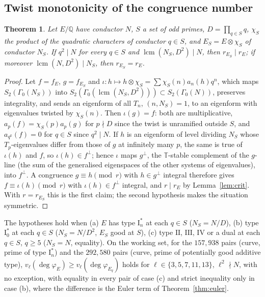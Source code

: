 \documentclass[11pt]{amsart}
\newtheorem{theorem}{Theorem}[section]
\theoremstyle{definition}
\newcommand{\Q}{\mathbb{Q}}
\newcommand{\T}{\mathbb{T}}
\newcommand{\degphi}{\deg\varphi_E}
\begin{document}
\subsection{Twist monotonicity of the congruence number}
\begin{theorem}\label{thm:twist}
Let $E/\Q$ have conductor $N$, $S$ a set of odd primes, $D=\prod_{q\in S}q$, $\chi_S$ the product of the quadratic characters of conductor $q\in S$, and $E_S=E\otimes\chi_S$ of conductor $N_S$. If $q^2\mid N$ for every $q\in S$ and $\operatorname{lcm}(N_S,D^2)\mid N$, then $r_{E_S}\mid r_E$; if moreover $\operatorname{lcm}(N,D^2)\mid N_S$, then $r_{E_S}=r_E$.
\end{theorem}
\begin{proof}
Let $f=f_E$, $g=f_{E_S}$ and $\iota\colon h\mapsto h\otimes\chi_S=\sum\chi_S(n)a_n(h)q^n$, which maps $S_2(\Gamma_0(N_S))$ into $S_2(\Gamma_0(\operatorname{lcm}(N_S,D^2)))\subset S_2(\Gamma_0(N))$, preserves integrality, and sends an eigenform of all $T_n$, $(n,N_S)=1$, to an eigenform with eigenvalues twisted by $\chi_S(n)$. Then $\iota(g)=f$: both are multiplicative, $a_p(f)=\chi_S(p)a_p(g)$ for $p\nmid D$ since the twist is unramified outside $S$, and $a_{q^k}(f)=0$ for $q\in S$ since $q^2\mid N$. If $h$ is an eigenform of level dividing $N_S$ whose $T_p$-eigenvalues differ from those of $g$ at infinitely many $p$, the same is true of $\iota(h)$ and $f$, so $\iota(h)\in f^\perp$; hence $\iota$ maps $g^\perp$, the $\T$-stable complement of the $g$-line (the sum of the generalised eigenspaces of the other systems of eigenvalues), into $f^\perp$. A congruence $g\equiv h\pmod r$ with $h\in g^\perp$ integral therefore gives $f\equiv\iota(h)\pmod r$ with $\iota(h)\in f^\perp$ integral, and $r\mid r_E$ by Lemma~\ref{lem:crit}. With $r=r_{E_S}$ this is the first claim; the second hypothesis makes the situation symmetric.
\end{proof}
The hypotheses hold when (a) $E$ has type $\mathrm{I}_n^*$ at each $q\in S$ ($N_S=N/D$), (b) type $\mathrm{I}_0^*$ at each $q\in S$ ($N_S=N/D^2$, $E_S$ good at $S$), (c) type $\mathrm{II}$, $\mathrm{III}$, $\mathrm{IV}$ or a dual at each $q\in S$, $q\ge5$ ($N_S=N$, equality). On the working set, for the $157{,}938$ pairs (curve, prime of type $\mathrm{I}_n^*$) and the $292{,}580$ pairs (curve, prime of potentially good additive type), $v_\ell(\degphi)\ge v_\ell(\deg\varphi_{E_q})$ holds for $\ell\in\{3,5,7,11,13\}$, $\ell^2\nmid N$, with no exception, with equality in every pair of case (c) and strict inequality only in case (b), where the difference is the Euler term of Theorem~\ref{thm:euler}.
\end{document}
